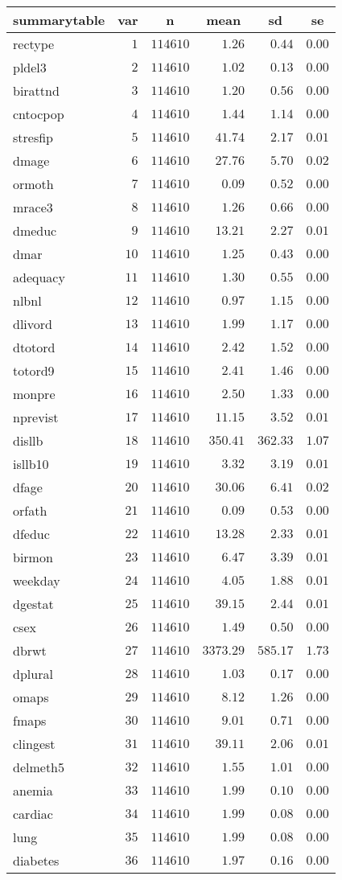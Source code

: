 %
\begin{table}[!tbp]
\begin{center}
\begin{tabular}{lrrrrr}
\hline\hline
\multicolumn{1}{l}{summarytable}&\multicolumn{1}{c}{var}&\multicolumn{1}{c}{n}&\multicolumn{1}{c}{mean}&\multicolumn{1}{c}{sd}&\multicolumn{1}{c}{se}\tabularnewline
\hline
rectype&$ 1$&$114610$&$   1.26$&$  0.44$&$0.00$\tabularnewline
pldel3&$ 2$&$114610$&$   1.02$&$  0.13$&$0.00$\tabularnewline
birattnd&$ 3$&$114610$&$   1.20$&$  0.56$&$0.00$\tabularnewline
cntocpop&$ 4$&$114610$&$   1.44$&$  1.14$&$0.00$\tabularnewline
stresfip&$ 5$&$114610$&$  41.74$&$  2.17$&$0.01$\tabularnewline
dmage&$ 6$&$114610$&$  27.76$&$  5.70$&$0.02$\tabularnewline
ormoth&$ 7$&$114610$&$   0.09$&$  0.52$&$0.00$\tabularnewline
mrace3&$ 8$&$114610$&$   1.26$&$  0.66$&$0.00$\tabularnewline
dmeduc&$ 9$&$114610$&$  13.21$&$  2.27$&$0.01$\tabularnewline
dmar&$10$&$114610$&$   1.25$&$  0.43$&$0.00$\tabularnewline
adequacy&$11$&$114610$&$   1.30$&$  0.55$&$0.00$\tabularnewline
nlbnl&$12$&$114610$&$   0.97$&$  1.15$&$0.00$\tabularnewline
dlivord&$13$&$114610$&$   1.99$&$  1.17$&$0.00$\tabularnewline
dtotord&$14$&$114610$&$   2.42$&$  1.52$&$0.00$\tabularnewline
totord9&$15$&$114610$&$   2.41$&$  1.46$&$0.00$\tabularnewline
monpre&$16$&$114610$&$   2.50$&$  1.33$&$0.00$\tabularnewline
nprevist&$17$&$114610$&$  11.15$&$  3.52$&$0.01$\tabularnewline
disllb&$18$&$114610$&$ 350.41$&$362.33$&$1.07$\tabularnewline
isllb10&$19$&$114610$&$   3.32$&$  3.19$&$0.01$\tabularnewline
dfage&$20$&$114610$&$  30.06$&$  6.41$&$0.02$\tabularnewline
orfath&$21$&$114610$&$   0.09$&$  0.53$&$0.00$\tabularnewline
dfeduc&$22$&$114610$&$  13.28$&$  2.33$&$0.01$\tabularnewline
birmon&$23$&$114610$&$   6.47$&$  3.39$&$0.01$\tabularnewline
weekday&$24$&$114610$&$   4.05$&$  1.88$&$0.01$\tabularnewline
dgestat&$25$&$114610$&$  39.15$&$  2.44$&$0.01$\tabularnewline
csex&$26$&$114610$&$   1.49$&$  0.50$&$0.00$\tabularnewline
dbrwt&$27$&$114610$&$3373.29$&$585.17$&$1.73$\tabularnewline
dplural&$28$&$114610$&$   1.03$&$  0.17$&$0.00$\tabularnewline
omaps&$29$&$114610$&$   8.12$&$  1.26$&$0.00$\tabularnewline
fmaps&$30$&$114610$&$   9.01$&$  0.71$&$0.00$\tabularnewline
clingest&$31$&$114610$&$  39.11$&$  2.06$&$0.01$\tabularnewline
delmeth5&$32$&$114610$&$   1.55$&$  1.01$&$0.00$\tabularnewline
anemia&$33$&$114610$&$   1.99$&$  0.10$&$0.00$\tabularnewline
cardiac&$34$&$114610$&$   1.99$&$  0.08$&$0.00$\tabularnewline
lung&$35$&$114610$&$   1.99$&$  0.08$&$0.00$\tabularnewline
diabetes&$36$&$114610$&$   1.97$&$  0.16$&$0.00$\tabularnewline

\end{tabular}
\end{center}
\end{table}
